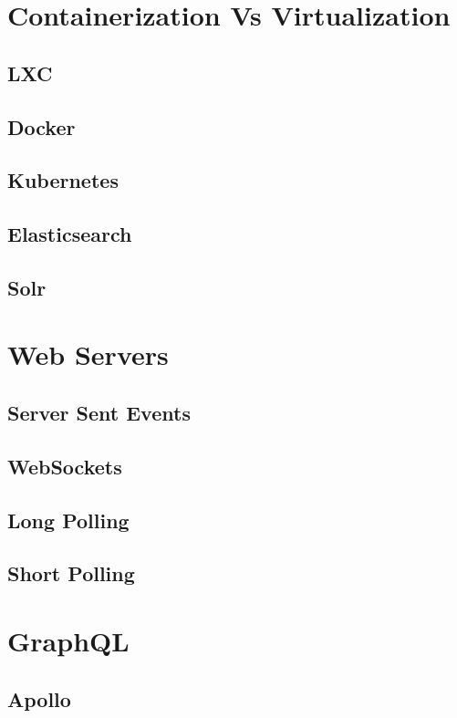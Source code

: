 \documentclass[a4paper]{article}
\begin{document}
    \newpage
    \section{Containerization Vs Virtualization} 
    \subsection{LXC}
    \subsection{Docker}
    \subsection{Kubernetes}
    \subsection{Elasticsearch}
    \subsection{Solr}


    \newpage
    \section{Web Servers}
    \subsection{Server Sent Events}
    \subsection{WebSockets}
    \subsection{Long Polling}
    \subsection{Short Polling}

    \newpage
    \section{GraphQL}
    \subsection{Apollo}
\end{document}
